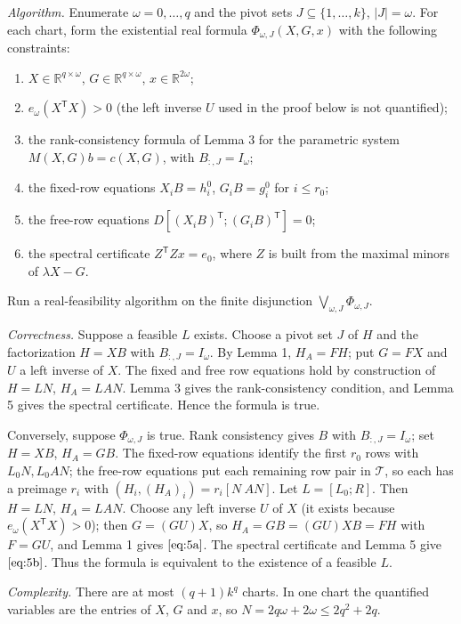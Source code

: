 \documentclass[journal]{IEEEtran}
\theoremstyle{plainn}
\begin{document}
\emph{Algorithm.} Enumerate $\omega=0,\ldots,q$ and the pivot sets $J\subseteq\{1,\dots,k\}$, $|J|=\omega$. For each chart, form the existential real formula $\Phi_{\omega,J}(X,G,x)$ with the following constraints:

\begin{enumerate}
\item $X\in\mathbb R^{q\times\omega}$, $G\in\mathbb R^{q\times\omega}$, $x\in\mathbb R^{2\omega}$;
\item $e_\omega(X^{\mathsf T}X)>0$ (the left inverse $U$ used in the proof below is not quantified);
\item the rank-consistency formula of Lemma 3 for the parametric system $M(X,G)b=c(X,G)$, with $B_{:,J}=I_\omega$;
\item the fixed-row equations $X_iB=h_i^0$, $G_iB=g_i^0$ for $i\le r_0$;
\item the free-row equations $D[(X_iB)^{\mathsf T};(G_iB)^{\mathsf T}]=0$;
\item the spectral certificate $Z^{\mathsf T}Zx=e_0$, where $Z$ is built from the maximal minors of $\lambda X-G$.
\end{enumerate}
Run a real-feasibility algorithm on the finite disjunction $\bigvee_{\omega,J}\Phi_{\omega,J}$.

\emph{Correctness.} Suppose a feasible $L$ exists. Choose a pivot set $J$ of $H$ and the factorization $H=XB$ with $B_{:,J}=I_\omega$. By Lemma 1, $H_A=FH$; put $G=FX$ and $U$ a left inverse of $X$. The fixed and free row equations hold by construction of $H=LN$, $H_A=LAN$. Lemma 3 gives the rank-consistency condition, and Lemma 5 gives the spectral certificate. Hence the formula is true.

Conversely, suppose $\Phi_{\omega,J}$ is true. Rank consistency gives $B$ with $B_{:,J}=I_\omega$; set $H=XB$, $H_A=GB$. The fixed-row equations identify the first $r_0$ rows with $L_0N,L_0AN$; the free-row equations put each remaining row pair in $\mathcal T$, so each has a preimage $r_i$ with $(H_i,(H_A)_i)=r_i[N\ AN]$. Let $L=[L_0;R]$. Then $H=LN$, $H_A=LAN$. Choose any left inverse $U$ of $X$ (it exists because $e_\omega(X^{\mathsf T}X)>0$); then $G=(GU)X$, so $H_A=GB=(GU)XB=FH$ with $F=GU$, and Lemma 1 gives $\eqref{eq:5a}$. The spectral certificate and Lemma 5 give $\eqref{eq:5b}$. Thus the formula is equivalent to the existence of a feasible $L$.

\emph{Complexity.} There are at most $(q+1)k^q$ charts. In one chart the quantified variables are the entries of $X$, $G$ and $x$, so $N=2q\omega+2\omega\le2q^2+2q$.
\end{document}
